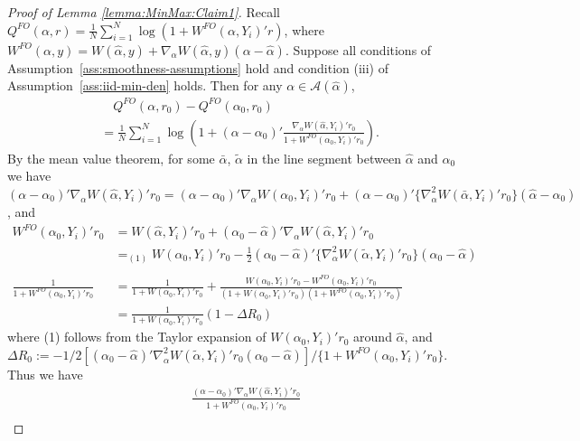 \documentclass[11pt]{article}
\begin{document}
\begin{proof}[Proof of Lemma \ref{lemma:MinMax:Claim1}]
Recall $Q^{FO}(\alpha,r)= \frac{1}{N}\sum_{i=1}^N \log(1+ W^{FO}(\alpha,Y_i)'r)$, where $W^{FO}(\alpha,y)=W(\hat \alpha,y)+\nabla_\alpha W(\hat\alpha,y)(\alpha-\hat\alpha)$. Suppose all conditions of Assumption~\ref{ass:smoothness-assumptions} hold and condition (iii) of Assumption~\ref{ass:iid-min-den} holds. Then for any $\alpha\in\mathcal{A}(\hat{\alpha})$,
\begin{equation}\label{eq:Main:MinMax}
\begin{array}{rl}
&\quad Q^{FO}(\alpha,r_0)-Q^{FO}(\alpha_0,r_0) \\
&\displaystyle = \frac{1}{N}\sum_{i=1}^N \log\left( 1 + (\alpha - \alpha_0)'\frac{\nabla_\alpha W(\hat\alpha,Y_i)'r_0}{1+W^{FO}(\alpha_0,Y_i)'r_0} \right).
\end{array}
\end{equation}
By the mean value theorem, for some $\bar{\alpha}$, $\tilde \alpha$ in the line segment between $\hat\alpha$ and $\alpha_0$ we have $(\alpha-\alpha_0)'\nabla_\alpha W(\hat\alpha,Y_i)'r_0 = (\alpha-\alpha_0)'\nabla_\alpha W(\alpha_0,Y_i)'r_0 + (\alpha-\alpha_0)'\{\nabla_\alpha^2 W(\bar{\alpha},Y_i)'r_0\}(\hat\alpha-\alpha_0)$, and 
$$ \begin{array}{rl}
W^{FO}(\alpha_0,Y_i)'r_0 &= W(\hat \alpha,Y_i)'r_0 + (\alpha_0-\hat\alpha)'\nabla_\alpha W(\hat\alpha,Y_i)'r_0\\
&\displaystyle =_{(1)} W(\alpha_0,Y_i)'r_0 -\frac{1}{2}(\alpha_0-\hat\alpha)'\{\nabla_\alpha^2 W(\tilde\alpha,Y_i)'r_0\}(\alpha_0-\hat\alpha)\\
\\
\displaystyle \frac{1}{1+W^{FO}(\alpha_0,Y_i)'r_0} &\displaystyle= \frac{1}{1+W(\alpha_0,Y_i)'r_0}+\frac{W(\alpha_0,Y_i)'r_0 -W^{FO}(\alpha_0,Y_i)'r_0}{(1+W(\alpha_0,Y_i)'r_0)(1+W^{FO}(\alpha_0,Y_i)'r_0)}\\
&\displaystyle = \frac{1}{1+W(\alpha_0,Y_i)'r_0}\left(1 -\Delta R_0\right)
\end{array}$$
where (1) follows from the Taylor expansion of $W(\alpha_0,Y_i)'r_0$ around $\hat{\alpha}$, and $\Delta R_0:=-1/2[(\alpha_0-\hat\alpha)'\nabla_\alpha^2 W(\tilde\alpha,Y_i)'r_0(\alpha_0-\hat\alpha)]/\{1+W^{FO}(\alpha_0,Y_i)'r_0\}$. Thus we have
\begin{equation}\label{eq:Aux:MinMax}\begin{array}{rl}
&\quad\displaystyle\frac{(\alpha - \alpha_0)'\nabla_\alpha W(\hat\alpha,Y_i)'r_0}{1+W^{FO}(\alpha_0,Y_i)'r_0}\\

\end{array}
\end{equation}
\end{proof}
\end{document}
